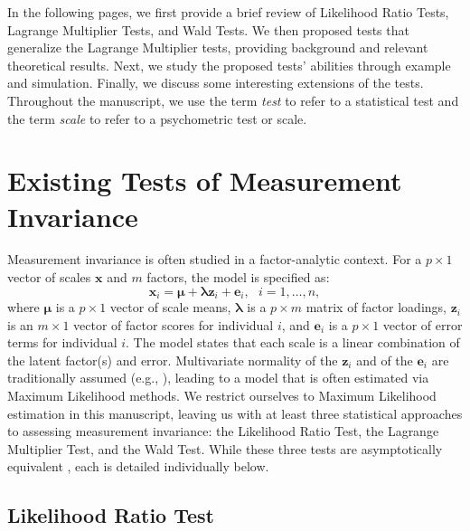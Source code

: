 \documentclass[man]{apa}
\begin{document}
In the following pages, we first provide a brief review of Likelihood
Ratio Tests, Lagrange Multiplier Tests, and Wald Tests.  We then
proposed tests that generalize the Lagrange Multiplier
tests, providing background and relevant theoretical results.  Next,
we study the 
proposed tests' abilities through example and simulation.  Finally,
we discuss some interesting extensions of the tests.
Throughout the manuscript, we use the term {\em{test}} to refer to a
statistical test and the term {\em{scale}} to refer to a psychometric 
test or scale.

\section{Existing Tests of Measurement Invariance}

Measurement invariance is often studied in a factor-analytic context.
For a $p \times 1$ vector of scales  
${\bm x}$ and $m$ factors, the model is
specified as:
\begin{equation}
    \label{eq:famod}
    {\bm x}_i = {\bm \mu} + {\bm \lambda}{\bm z}_i + {\bm e}_i,\ \ \ i=1,\ldots,n,
\end{equation}
where ${\bm \mu}$ is a $p \times 1$ vector of scale means, ${\bm
  \lambda}$ is a $p \times m$ matrix of factor loadings, ${\bm z}_i$ is
an $m \times 1$ vector of factor scores for individual $i$, and ${\bm
  e}_i$ is a $p \times 1$ vector of error terms for individual $i$.
The model states that each scale is a
linear combination of the latent factor(s) and error.  
Multivariate normality of the ${\bm z}_i$ and of the ${\bm e}_i$ are
traditionally assumed (e.g., ), leading to a model
that is often estimated via Maximum Likelihood methods.  We restrict
ourselves to Maximum Likelihood estimation in this manuscript, leaving
us with at least three statistical approaches to assessing measurement
invariance: the Likelihood Ratio Test, the
Lagrange Multiplier Test, and the Wald Test.  While these three tests
are asymptotically equivalent \cite{Sat89}, each is detailed
individually below.

\subsection{Likelihood Ratio Test}
\end{document}
